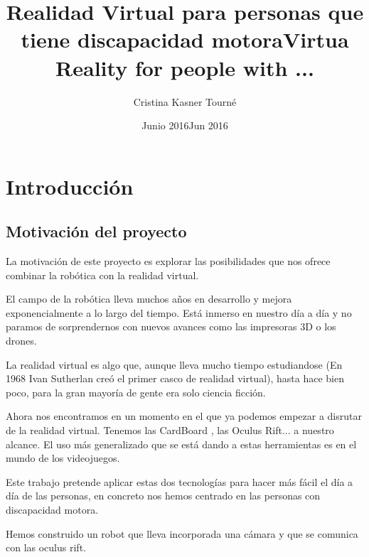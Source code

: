 \documentclass[twoside, 12pt]{epstfg}
\title[spa]{Realidad Virtual para personas que tiene discapacidad motora}
\title[eng]{Virtua Reality for people with ...}
\author{Cristina Kasner Tourné}
\date[spa]{Junio 2016}
\date[eng]{Jun 2016}
\begin{document}

\frontmatter

\maketitle[spa]

\makeinnertitle[spa]

\makeabstract[spa]
\makeabstract[eng]

\tableofcontents
\clearpage
\listoftables
\clearpage
\listoffigures
\cleardoublepage

\printnoidxglossaries

\mainmatter
\chapter{Introducción} 


\section{Motivación del proyecto}
La motivación de este proyecto es explorar las posibilidades que nos ofrece combinar la robótica con la realidad virtual.

El campo de la robótica lleva muchos años en desarrollo y mejora exponencialmente a lo largo del tiempo. Está inmerso en nuestro día a día y no paramos de sorprendernos con nuevos avances como las impresoras 3D o los drones.

La realidad virtual es algo que, aunque lleva mucho tiempo estudiandose (En 1968 Ivan Sutherlan creó el primer casco de realidad virtual), hasta hace bien poco, para la gran mayoría de gente era solo ciencia ficción.

Ahora nos encontramos en un momento en el que ya podemos empezar a disrutar de la realidad virtual. Tenemos las CardBoard , las Oculus Rift... a nuestro alcance.
El uso más generalizado que se está dando a estas herramientas es en el mundo de los videojuegos.

Este trabajo pretende aplicar estas dos tecnologías para hacer más fácil el día a día de las personas, en concreto nos hemos centrado en las personas con discapacidad motora.

Hemos construido un robot que lleva incorporada una cámara y que se comunica con las oculus rift.
\end{document}
